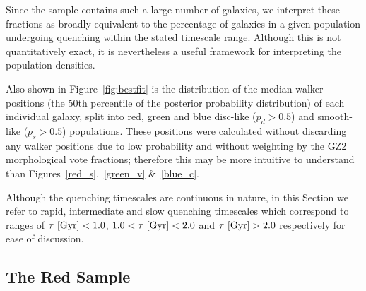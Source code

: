 Since the sample contains such a large number of galaxies, we interpret these fractions as broadly equivalent to the percentage of galaxies in a given population undergoing quenching within the stated timescale range. Although this is not quantitatively exact, it is nevertheless a useful framework for interpreting the population densities.

Also shown in Figure~\ref{fig:bestfit} is the distribution of the median walker positions (the 50th percentile of the posterior probability distribution) of each individual galaxy, split into red, green and blue disc-like ($p_d > 0.5$) and smooth-like ($p_s > 0.5$) populations. These positions were calculated without discarding any walker positions due to low probability and without weighting by the GZ2 morphological vote fractions; therefore this may be more intuitive to understand than Figures~\ref{red_s},~\ref{green_v} \&~\ref{blue_c}.

Although the quenching timescales are continuous in nature, in this Section we refer to rapid, intermediate and slow quenching timescales which correspond to ranges of  $\tau ~\rm{[Gyr]} < 1.0$, $1.0 < \tau ~\rm{[Gyr]} < 2.0$ and $\tau ~\rm{[Gyr]} > 2.0$ respectively for ease of discussion.



\subsection{The Red Sample}\label{rs}

